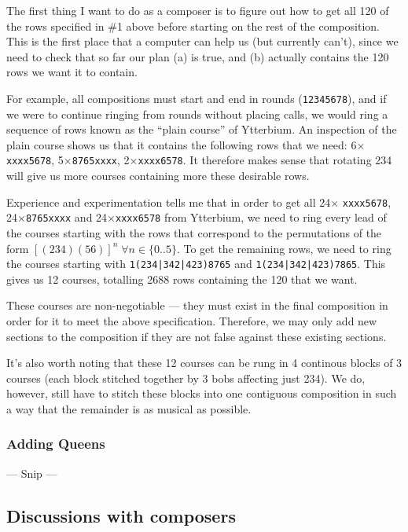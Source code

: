 \documentclass[12pt]{article}
\newcommand{\row}[1]{\texttt{#1}}
\begin{document}
The first thing I want to do as a composer is to figure out how to get all 120 of the rows specified
in \#1 above before starting on the rest of the composition.  This is the first place that a computer
can help us (but currently can't), since we need to check that so far our plan (a) is true, and (b)
actually contains the 120 rows we want it to contain.

For example, all compositions must start and end in rounds (\row{12345678}), and if we were to
continue ringing from rounds without placing calls, we would ring a sequence of rows known as the
``plain course'' of Ytterbium.  An inspection of the plain course shows us that it contains the
following rows that we need: 6$\times$\row{xxxx5678}, 5$\times$\row{8765xxxx},
2$\times$\row{xxxx6578}.  It therefore makes sense that rotating 234 will give us more courses
containing more these desirable rows.

Experience and experimentation tells me that in order to get all 24$\times$ \row{xxxx5678},
24$\times$\row{8765xxxx} and 24$\times$\row{xxxx6578} from Ytterbium, we need to ring every lead of
the courses starting with the rows that correspond to the permutations of the form
${[(234)(56)]}^n \; \forall n \in \{0..5\}$.  To get the remaining rows, we need to ring the
courses starting with \row{1(234|342|423)8765} and \row{1(234|342|423)7865}.  This gives us 12
courses, totalling 2688 rows containing the 120 that we want.

These courses are non-negotiable --- they must exist in the final composition in order for it to
meet the above specification.  Therefore, we may only add new sections to the composition if they
are not false against these existing sections.

It's also worth noting that these 12 courses can be rung in 4 continous blocks of 3 courses (each
block stitched together by 3 bobs affecting just 234).  We do, however, still have to stitch these
blocks into one contiguous composition in such a way that the remainder is as musical as possible.

\subsubsection{Adding Queens}

--- Snip ---



\subsection{Discussions with composers}
\end{document}
